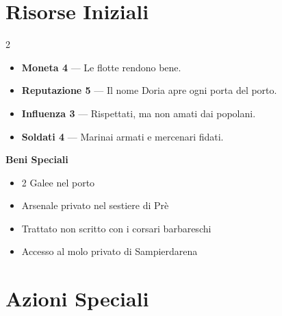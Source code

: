 \section{Risorse Iniziali}
\label{sec:doria-risorse}


\begin{multicols}{2}

\begin{itemize}
  \item \textbf{Moneta 4} — Le flotte rendono bene.
  \item \textbf{Reputazione 5} — Il nome Doria apre ogni porta del porto.
  \item \textbf{Influenza 3} — Rispettati, ma non amati dai popolani.
  \item \textbf{Soldati 4} — Marinai armati e mercenari fidati.
\end{itemize}

\columnbreak

\textbf{Beni Speciali}
\begin{itemize}
  \item 2 Galee nel porto
  \item Arsenale privato nel sestiere di Prè
  \item Trattato non scritto con i corsari barbareschi
  \item Accesso al molo privato di Sampierdarena
\end{itemize}

\end{multicols}

\section{Azioni Speciali}
\label{sec:doria-azioni}



